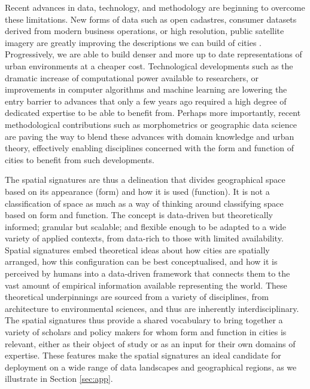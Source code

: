 Recent advances in data, technology, and methodology are beginning to overcome
these limitations.
New forms of data such as open cadastres, consumer datasets derived from
modern business operations, or high resolution, public satellite imagery are
greatly improving the descriptions we can build of cities
\citep{arribas2014accidental, glaeser2018big, wei2020multiscale, fleischmann2021evolution}. Progressively, we are able to build denser and
more up to date representations of urban environments at a cheaper cost.
Technological developments such as the dramatic increase of computational
power available to researchers, or improvements in computer algorithms and machine
learning are lowering the entry barrier to advances that only a few years ago
required a high degree of dedicated expertise to be able to benefit from.
Perhaps more importantly, recent methodological contributions such as
morphometrics \citep{dibble2016urban} or geographic data science
\citep{singleton2021geographic} are paving the way to blend these advances
with domain knowledge and urban theory, effectively enabling disciplines
concerned with the form and function of cities to benefit from such
developments.

The spatial signatures are thus a delineation that divides geographical space
based on its appearance (form) and how it is used (function).
It is not a classification of space as much as a way of thinking around
classifying space based on form and function.
The concept is data-driven but theoretically informed;
granular but scalable; and flexible enough to be adapted to a wide variety of
applied contexts, from data-rich to those with limited availability.
Spatial signatures embed theoretical ideas about how cities are
spatially arranged, how this configuration can be best conceptualised, and how
it is perceived by humans into a data-driven framework that connects them to the
vast amount of empirical information available representing the world.
These theoretical underpinnings are sourced from a variety of disciplines,
from architecture to environmental sciences, and thus are inherently
interdisciplinary.
The spatial signatures thus provide a shared vocabulary to bring together a
variety of scholars and policy makers for whom form and function in cities is
relevant, either as their object of study or as an input for their own domains
of expertise.
These features make the spatial signatures an ideal candidate
for deployment on a wide range of data landscapes and geographical regions, as
we illustrate in Section \ref{sec:app}.

